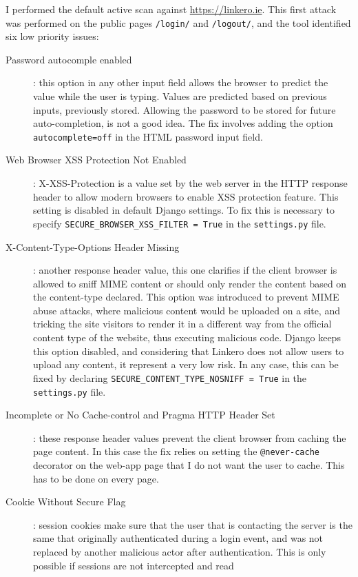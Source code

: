 I performed the default active scan against \url{https://linkero.ie}. This
first attack was performed on the public pages \texttt{/login/} and
\texttt{/logout/}, and the tool identified six low priority issues:
\begin{description}
  \item[Password autocomple enabled]: this option in any other input field
  allows the browser to predict the value while the user is typing. Values are
  predicted based on previous inputs, previously stored. Allowing the password
  to be stored for future auto-completion, is not a good idea. The fix involves
  adding the option \texttt{autocomplete=off} in the HTML password input field.
  \item[Web Browser XSS Protection Not Enabled]: X-XSS-Protection is a
  value set by the web server in the HTTP response header to allow modern
  browsers to enable XSS protection feature. This setting is disabled in default
  Django settings. To fix this is necessary to specify
  \texttt{SECURE\_BROWSER\_XSS\_FILTER = True} in the \texttt{settings.py} file.
  \item[X-Content-Type-Options Header Missing]: another response header value,
  this one clarifies if the client browser is allowed to sniff MIME content or
  should only render the content based on the content-type declared. This option
  was introduced to prevent MIME abuse attacks, where malicious content would be
  uploaded on a site, and tricking the site visitors to render it in a different
  way from the official content type of the website, thus executing
  malicious code. Django keeps this option disabled, and considering that
  Linkero does not allow users to upload any content, it represent a very low
  risk. In any case, this can be fixed by declaring
  \texttt{SECURE\_CONTENT\_TYPE\_NOSNIFF = True} in the \texttt{settings.py}
  file.
  \item[Incomplete or No Cache-control and Pragma HTTP Header Set]: these
  response header values prevent the client browser from caching the page
  content. In this case the fix relies on setting the \texttt{@never-cache}
  decorator on the web-app page that I do not want the user to cache. This has
  to be done on every page.
  \item[Cookie Without Secure Flag]: session cookies make sure that the user
  that is contacting the server is the same that originally authenticated during
  a login event, and was not replaced by another malicious actor after
  authentication. This is only possible if sessions are not intercepted and read

\end{description}
